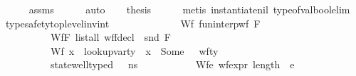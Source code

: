 \begin{isabellebody}
\ \ \ \ \isamarkupfalse%
\ assms\isanewline
\ \ \ \ \isamarkupfalse%
\ auto\isanewline
\ \ \isamarkupfalse%
\ {\isacharquery}{\kern0pt}thesis\isanewline
\ \ \ \ \isamarkupfalse%
\ {\isacharparenleft}{\kern0pt}metis\ instantiate{\isacharunderscore}{\kern0pt}nil\ type{\isacharunderscore}{\kern0pt}of{\isacharunderscore}{\kern0pt}val{\isacharunderscore}{\kern0pt}bool{\isacharunderscore}{\kern0pt}elim{\isacharparenright}{\kern0pt}\isanewline
{}\isamarkupfalse%
%
\endisatagproof
{\isafoldproof}%
%
\isadelimproof
\isanewline
%
\endisadelimproof
\isanewline
{}\isamarkupfalse%
\ type{\isacharunderscore}{\kern0pt}safety{\isacharunderscore}{\kern0pt}top{\isacharunderscore}{\kern0pt}level{\isacharunderscore}{\kern0pt}inv{\isacharunderscore}{\kern0pt}int{\isacharcolon}{\kern0pt}\isanewline
\ \ \ \isanewline
\ \ \ \ \ \ \ \ \ \ Wf{\isacharunderscore}{\kern0pt}{\isasymGamma}{\isacharcolon}{\kern0pt}\ {\isachardoublequoteopen}fun{\isacharunderscore}{\kern0pt}interp{\isacharunderscore}{\kern0pt}wf\ F\ {\isasymGamma}{\isachardoublequoteclose}\ \isanewline
\ \ \ \ \ \ \ \ \ \ Wf{\isacharunderscore}{\kern0pt}F{\isacharcolon}{\kern0pt}\ {\isachardoublequoteopen}list{\isacharunderscore}{\kern0pt}all\ {\isacharparenleft}{\kern0pt}wf{\isacharunderscore}{\kern0pt}fdecl\ {\isasymcirc}\ snd{\isacharparenright}{\kern0pt}\ F{\isachardoublequoteclose}\ \isanewline
\ \ \ \ \ \ \ \ \ \ Wf{\isacharunderscore}{\kern0pt}{\isasymLambda}{\isacharcolon}{\kern0pt}\ {\isachardoublequoteopen}{\isasymforall}x\ {\isasymtau}{\isachardot}{\kern0pt}\ lookup{\isacharunderscore}{\kern0pt}var{\isacharunderscore}{\kern0pt}ty\ {\isasymLambda}\ x\ {\isacharequal}{\kern0pt}\ Some\ {\isasymtau}\ {\isasymlongrightarrow}\ wf{\isacharunderscore}{\kern0pt}ty\ {}\ {\isasymtau}{\isachardoublequoteclose}\ \ \ \ \ \isanewline
\ \ \ \ \ \ \ \ \ \ {\isachardoublequoteopen}state{\isacharunderscore}{\kern0pt}well{\isacharunderscore}{\kern0pt}typed\ {\isasymLambda}\ {\isacharbrackleft}{\kern0pt}{\isacharbrackright}{\kern0pt}\ n{\isacharunderscore}{\kern0pt}s{\isachardoublequoteclose}\ \isanewline
\ \ \ \ \ \ \ \ \ \ Wf{\isacharunderscore}{\kern0pt}e{\isacharcolon}{\kern0pt}\ {\isachardoublequoteopen}wf{\isacharunderscore}{\kern0pt}expr\ {\isacharparenleft}{\kern0pt}length\ {\isacharbrackleft}{\kern0pt}{\isacharbrackright}{\kern0pt}{\isacharparenright}{\kern0pt}\ e{\isachardoublequoteclose}\ \isanewline

\end{isabellebody}

